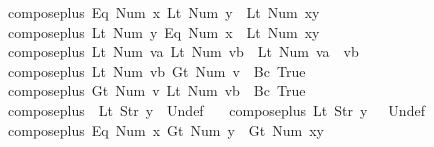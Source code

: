 \begin{isabellebody}
\ \ {\isachardoublequoteopen}compose{\isacharunderscore}plus\ {\isacharparenleft}Eq\ {\isacharparenleft}Num\ x{\isacharparenright}{\isacharparenright}\ {\isacharparenleft}Lt\ {\isacharparenleft}Num\ y{\isacharparenright}{\isacharparenright}\ {\isacharequal}\ Lt\ {\isacharparenleft}Num\ {\isacharparenleft}x{\isacharplus}y{\isacharparenright}{\isacharparenright}{\isachardoublequoteclose}\ {\isacharbar}\isanewline
\ \ {\isachardoublequoteopen}compose{\isacharunderscore}plus\ {\isacharparenleft}Lt\ {\isacharparenleft}Num\ y{\isacharparenright}{\isacharparenright}\ {\isacharparenleft}Eq\ {\isacharparenleft}Num\ x{\isacharparenright}{\isacharparenright}\ {\isacharequal}\ Lt\ {\isacharparenleft}Num\ {\isacharparenleft}x{\isacharplus}y{\isacharparenright}{\isacharparenright}{\isachardoublequoteclose}\ {\isacharbar}\isanewline
\ \ {\isachardoublequoteopen}compose{\isacharunderscore}plus\ {\isacharparenleft}Lt\ {\isacharparenleft}Num\ va{\isacharparenright}{\isacharparenright}\ {\isacharparenleft}Lt\ {\isacharparenleft}Num\ vb{\isacharparenright}{\isacharparenright}\ {\isacharequal}\ Lt\ {\isacharparenleft}Num\ {\isacharparenleft}va\ {\isacharplus}\ vb{\isacharparenright}{\isacharparenright}{\isachardoublequoteclose}\ {\isacharbar}\isanewline
\ \ {\isachardoublequoteopen}compose{\isacharunderscore}plus\ {\isacharparenleft}Lt\ {\isacharparenleft}Num\ vb{\isacharparenright}{\isacharparenright}\ {\isacharparenleft}Gt\ {\isacharparenleft}Num\ v{\isacharparenright}{\isacharparenright}\ {\isacharequal}\ Bc\ True{\isachardoublequoteclose}\ {\isacharbar}\isanewline
\ \ {\isachardoublequoteopen}compose{\isacharunderscore}plus\ {\isacharparenleft}Gt\ {\isacharparenleft}Num\ v{\isacharparenright}{\isacharparenright}\ {\isacharparenleft}Lt\ {\isacharparenleft}Num\ vb{\isacharparenright}{\isacharparenright}\ {\isacharequal}\ Bc\ True{\isachardoublequoteclose}\ {\isacharbar}\isanewline
\ \ {\isachardoublequoteopen}compose{\isacharunderscore}plus\ {\isacharunderscore}\ {\isacharparenleft}Lt\ {\isacharparenleft}Str\ y{\isacharparenright}{\isacharparenright}\ {\isacharequal}\ Undef{\isachardoublequoteclose}\ {\isacharbar}\isanewline
\ \ {\isachardoublequoteopen}compose{\isacharunderscore}plus\ {\isacharparenleft}Lt\ {\isacharparenleft}Str\ y{\isacharparenright}{\isacharparenright}\ {\isacharunderscore}\ {\isacharequal}\ Undef{\isachardoublequoteclose}\ {\isacharbar}\isanewline
\ \ {\isachardoublequoteopen}compose{\isacharunderscore}plus\ {\isacharparenleft}Eq\ {\isacharparenleft}Num\ x{\isacharparenright}{\isacharparenright}\ {\isacharparenleft}Gt\ {\isacharparenleft}Num\ y{\isacharparenright}{\isacharparenright}\ {\isacharequal}\ Gt\ {\isacharparenleft}Num\ {\isacharparenleft}x{\isacharplus}y{\isacharparenright}{\isacharparenright}{\isachardoublequoteclose}\ {\isacharbar}\isanewline

\end{isabellebody}
